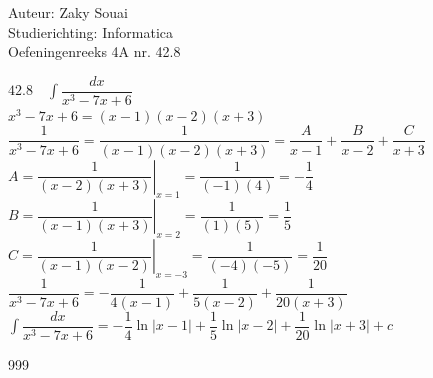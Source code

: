 \documentclass[a4paper]{article}
\begin{document}
  
\noindent \large Auteur: Zaky Souai \\
\noindent \large Studierichting:  Informatica\\
\noindent \large Oefeningenreeks 4A nr. 42.8\\

\bigskip

\normalsize

$\displaystyle 42.8\quad \int \dfrac{dx}{x^3-7x+6}$\\

$\displaystyle x^3-7x+6=(x-1)(x-2)(x+3)$\\

$\displaystyle \dfrac{1}{x^3-7x+6}=\dfrac{1}{(x-1)(x-2)(x+3)}=\dfrac{A}{x-1}+\dfrac{B}{x-2}+\dfrac{C}{x+3}$\\

$\displaystyle A=\left.\dfrac{1}{(x-2)(x+3)}\right|_{x=1}=\dfrac{1}{(-1)(4)}=-\dfrac{1}{4}$\\

$\displaystyle B=\left.\dfrac{1}{(x-1)(x+3)}\right|_{x=2}=\dfrac{1}{(1)(5)}=\dfrac{1}{5}$\\

$\displaystyle C=\left.\dfrac{1}{(x-1)(x-2)}\right|_{x=-3}=\dfrac{1}{(-4)(-5)}=\dfrac{1}{20}$\\

$\displaystyle \dfrac{1}{x^3-7x+6}=-\dfrac{1}{4(x-1)}+\dfrac{1}{5(x-2)}+\dfrac{1}{20(x+3)}$\\

$\displaystyle \int \dfrac{dx}{x^3-7x+6}=-\dfrac{1}{4}\ln|x-1|+\dfrac{1}{5}\ln|x-2|+\dfrac{1}{20}\ln|x+3|+c$


\begin{thebibliography}{999}
\end{thebibliography}
\end{document}
